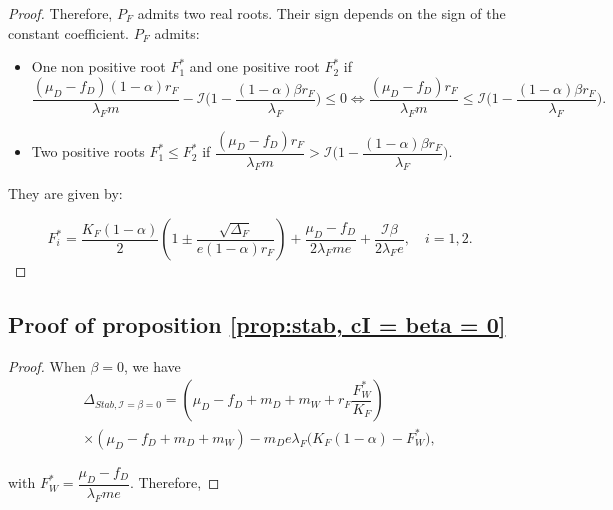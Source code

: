 \documentclass{article}
\newcommand{\lfw}{\lambda_{F}}
\newcommand{\lfw}{\lambda_{F}}
\newcommand{\cI}{\mathcal{I}}
\begin{document}
\begin{appendix}
\begin{proof}
Therefore, $P_F$ admits two real roots. Their sign depends on the sign of the constant coefficient. $P_F$ admits:
\begin{itemize}
\item One non positive root $F^*_1$ and one positive root $F^*_2$ if $$\dfrac{(\mu_D - f_D)(1-\alpha) r_F}{\lfw m} - \cI\Big(1 - \dfrac{(1-\alpha)\beta r_F}{\lfw} \Big) \leq 0 \Leftrightarrow \dfrac{(\mu_D - f_D) r_F}{\lfw m } \leq \cI\Big(1 - \dfrac{(1-\alpha)\beta r_F}{\lfw} \Big).$$
\item Two positive roots $F^*_1\leq  F^*_2$ if $\dfrac{(\mu_D - f_D) r_F}{\lfw m } > \cI\Big(1 - \dfrac{(1-\alpha)\beta r_F}{\lfw} \Big)$.
\end{itemize}
They are given by:

\begin{equation*}
F_i^* = \dfrac{K_F(1-\alpha)}{2}\left(1 \pm \dfrac{\sqrt{\Delta_F}}{e(1-\alpha)r_F}\right) + \dfrac{\mu_D - f_D}{2\lfw m e} + \dfrac{\cI \beta}{2\lfw e}, \quad i=1,2.
\end{equation*}
\end{proof}

\subsection{Proof of proposition \ref{prop:stab, cI = beta = 0}}

\begin{proof}
When $\beta = 0$, we have
\begin{multline} \label{DeltaStab, generalCase}
\Delta_{Stab, \cI =\beta = 0} =  \left(\mu_D - f_D + m_D + m_W + r_F\dfrac{F_W^*}{K_F} \right) \\ \times   \left( \mu_D -f_D + m_D + m_W \right) - m_D e \lfw \Big(K_F(1-\alpha) - F_W^* \Big),
\end{multline}

with $F_W^* = \dfrac{\mu_D - f_D}{\lfw m e}$. Therefore,


\end{proof}
\end{appendix}
\end{document}
